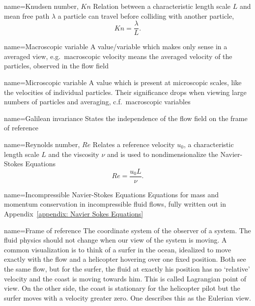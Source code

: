 
{
name={Knudsen number, $Kn$}
}
{Relation between a characteristic length scale $L$ and mean free path $\lambda$ a particle can travel before colliding with another particle,
\begin{equation}
  \label{eq: definition of knudsen number}
  Kn=\frac{\lambda}{L}.
\end{equation}}

{
name={Macroscopic variable}
}
{A value/variable which makes only sense in a averaged view, e.g.\ macroscopic velocity means the averaged velocity of the particles, observed in the flow field
}

{
name={Microscopic variable}
}
{
A value which is present at microscopic scales, like the velocities of individual particles.
Their significance drops when viewing large numbers of particles and averaging, c.f.\ macroscopic variables
}

{
name={Galilean invariance}
}{States the independence of the flow field on the frame of reference}

{
name={Reynolds number, $Re$}
}
{Relates a reference velocity $u_0$, a characteristic length scale $L$ and the viscosity $\nu$ and is used to nondimensionalize the Navier-Stokes Equations
\begin{equation}
  \label{eq: definition of reynolds number}
  Re=\frac{u_0 L}{\nu}.
\end{equation}}

{
name={Incompressible Navier-Stokes Equations}
}
{Equations for mass and momentum conservation in incompressible fluid flows, fully written out in Appendix~\ref{appendix: Navier Sokes Equations}
}

{
name={Frame of reference}
}
{
The coordinate system of the observer of a system.
The fluid physics should not change when our view of the system is moving.
A common visualization is to think of a surfer in the ocean, idealized to move exactly with the flow and a helicopter hovering over one fixed position.
Both see the same flow, but for the surfer, the fluid at exactly his position has no `relative' velocity and the coast is moving towards him. This is called Lagrangian point of view.
On the other side, the coast is stationary for the helicopter pilot but the surfer moves with a velocity greater zero. One describes this as the Eulerian view.
}
